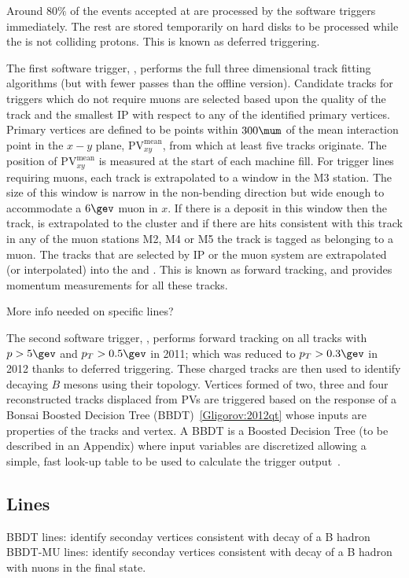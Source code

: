 Around $80\%$ of the events accepted at \lone are processed by the software triggers immediately.
The rest are stored temporarily on hard disks to be processed while the \lhc is not colliding protons.
This is known as deferred triggering.

The first software trigger, \hltone, performs the full three dimensional \velo track fitting
algorithms (but with fewer passes than the offline version).
Candidate \velo tracks for triggers which do not require muons are selected based upon the quality of the
\velo track and the smallest IP with respect to any of the identified primary vertices.
Primary vertices are defined to be points within $300\mum$ of the mean
interaction point in the $x-y$ plane, $\mathrm{PV}^\mathrm{mean}_{xy}$, from which at least five
tracks originate.
The position of $\mathrm{PV}^\mathrm{mean}_{xy}$ is measured at the start of each \lhc machine
fill.
For trigger lines requiring muons, each \velo track is extrapolated to a window in the M3
station.
The size of this window is narrow in the non-bending direction but wide enough to accommodate a $6\gev$
muon in $x$.
If there is a deposit in this window then the \velo track, is extrapolated to the cluster and if
there are hits consistent with this track in any of the muon stations M2, M4 or M5 the track is
tagged as belonging to a muon.
The \velo tracks that are selected by IP or the muon system are extrapolated (or interpolated) into
the \intr and \ot.
This is known as forward tracking, and provides momentum measurements for all these tracks.

More info needed on specific lines?

The second software trigger, \hlttwo, performs forward tracking on all \velo tracks with
$p>5\gev$ and $p_T>0.5\gev$ in 2011; which was reduced to $p_T>0.3\gev$ in 2012 thanks to deferred
triggering.
These charged tracks are then used to identify decaying $B$ mesons using their topology.
Vertices formed of two, three and four reconstructed tracks displaced from PVs are triggered based
on the response of a Bonsai Boosted Decision Tree (BBDT)~\ref{Gligorov:2012qt} whose inputs are
properties of the tracks and vertex.
A BBDT is a Boosted Decision Tree (to be described in an Appendix) where input variables are
discretized allowing a simple, fast look-up table to be used to calculate the trigger
output~\cite{Gligorov:2012qt}.








\subsection{Lines}
BBDT lines: identify seconday vertices consistent with decay of a B hadron
BBDT-MU lines: identify seconday vertices consistent with decay of a B hadron with nuons in the
final state.


